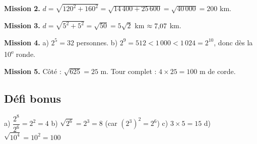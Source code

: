 \documentclass[../main.tex]{subfiles}
\begin{document}
\textbf{Mission 2.} $d = \sqrt{120^2 + 160^2} = \sqrt{14\,400 + 25\,600} = \sqrt{40\,000} = 200$ km.

\textbf{Mission 3.} $d = \sqrt{5^2 + 5^2} = \sqrt{50} = 5\sqrt{2}$ km $\approx 7{,} 07$ km.

\textbf{Mission 4.} a) $2^5 = 32$ personnes. \quad b) $2^9 = 512 < 1\,000 < 1\,024 = 2^{10}$, donc dès la 10\textsuperscript{e} ronde.

\textbf{Mission 5.} Côté : $\sqrt{625} = 25$ m. Tour complet : $4 \times 25 = 100$ m de corde.

\subsection*{Défi bonus}

a) $\dfrac{2^8}{2^6} = 2^2 = 4$ \quad b) $\sqrt{2^6} = 2^3 = 8$ (car $(2^3)^2 = 2^6$) \quad c) $3 \times 5 = 15$ \quad d) $\sqrt{10^4} = 10^2 = 100$
\end{document}
